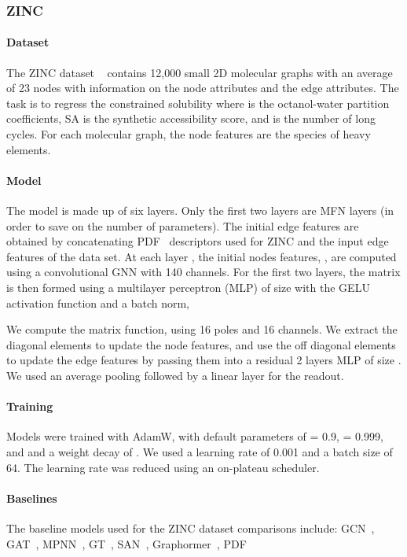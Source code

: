 \documentclass{article} \usepackage{iclr2024_conference,times}
\begin{document}
\subsubsection{ZINC}


\paragraph{Dataset}
The ZINC dataset ~\citep{Irwin2004} contains 12,000 small 2D molecular graphs with an average of 23 nodes with information on the node attributes and the edge attributes. The task is to regress the constrained solubility  where  is the octanol-water partition coefficients,
SA is the synthetic accessibility score, and  is the number of long cycles. For
each molecular graph, the node features are the species of heavy elements.

\paragraph{Model}
The model is made up of six layers.
Only the first two layers are MFN layers (in order to save on the number of parameters).
The initial edge features  are obtained by concatenating PDF~\cite{yang2023better} descriptors used for ZINC and the input edge features of the data set.  At each layer , the initial nodes features, , are computed using a convolutional GNN with 140 channels. 
For the first two layers, the matrix is then formed using a multilayer perceptron (MLP) of size  with the GELU activation function and a batch norm,

We compute the matrix function, using 16 poles and 16 channels. We extract the diagonal elements to update the node features, and use the off diagonal elements to update the edge features by passing them into a residual 2 layers MLP of size . We used an average pooling followed by a linear layer for the readout.

\paragraph{Training}
 Models were trained with AdamW,
with default parameters of  = 0.9,  = 0.999, and  and a weight decay of .
We used a learning rate of 0.001 and a batch size of 64.
The learning rate was reduced using an on-plateau scheduler.

\paragraph{Baselines} 
\label{sec:baseline-zinc}
The baseline models used for the ZINC dataset comparisons include: 
GCN~\citep{kipf2017semi},
GAT~\citep{velickovic2018graph},
MPNN~\citep{gilmer2017neural},
GT~\citep{dwivedi2020benchmarking},
SAN~\citep{kreuzer2021rethinking},
Graphormer~\citep{ying2021transformers},
PDF~\citep{yang2023better}
\end{document}
